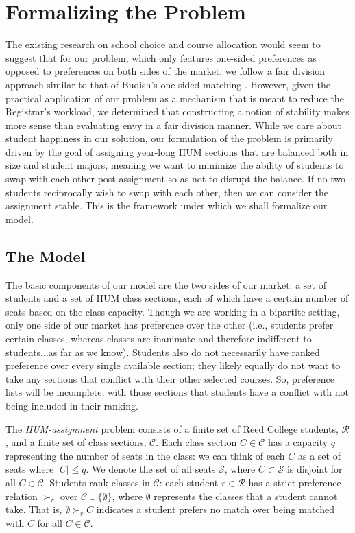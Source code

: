 \chapter{Formalizing the Problem} 
The existing research
on school choice and course allocation would seem to suggest that for our
problem, which only features one-sided preferences as opposed to preferences on
both sides of the market, we follow a fair division approach similar to that of
Budish’s one-sided matching \cite{budish}. However, given the practical application of our
problem as a mechanism that is meant to reduce the Registrar's workload, we
determined that constructing a notion of stability makes more sense than
evaluating envy in a fair division manner. While we care about student happiness in our
solution, our formulation of the problem is primarily driven by the goal of
assigning year-long HUM sections that are balanced both in size and student
majors, meaning we want to minimize the ability of students to swap with each
other post-assignment so as not to disrupt the balance. If no two students
reciprocally wish to swap with each other, then we can consider the assignment stable. This is the
framework under which we shall formalize our model.

\section{The Model}

The basic components of our model are the two sides of our market: a set of
students and a set of HUM class sections, each of which have a certain number of
seats based on the class capacity. Though we are working in a bipartite setting,
only one side of our market has preference over the other (i.e., students prefer
certain classes, whereas classes are inanimate and therefore indifferent to
students...as far as we know). Students
also do not necessarily have ranked preference over every single available
section; they likely equally do not want to take any sections that conflict with
their other selected courses. So, preference lists will be incomplete, with
those sections that students have a conflict with not being included in their ranking.
\newpage

\begin{definition} \label{def:overview}
  The \emph{HUM-assignment} problem consists of a finite set of Reed College
  students, $\mathcal{R}$, and a finite set of class sections, $\mathcal{C}$.
  Each class section $C \in \mathcal{C}$ has a capacity $q$ representing the
  number of seats in the class: we can think of each $C$ as a set of seats where
  $|C| \leq q$. We denote the set of all seats $\mathcal{S}$, where $C \subset
  \mathcal{S}$ is disjoint for all $C \in \mathcal{C}$. Students rank classes in
  $\mathcal{C}$: each student $r \in \mathcal{R}$ has a strict preference relation $\succ_r$ over
  $\mathcal{C} \cup \{\emptyset\}$, where $\emptyset$ represents the classes that
  a student cannot take. That is, $\emptyset \succ_r C$ indicates a student prefers
  no match over being matched with $C$ for all $C \in \mathcal{C}$.
\end{definition}

